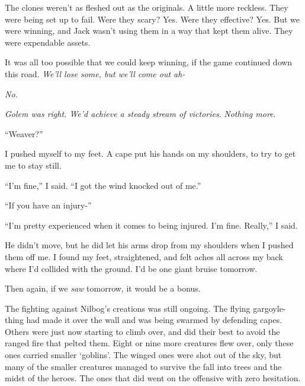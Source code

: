 The clones weren't as fleshed out as the originals.  A little more reckless.  They were being set up to fail.  Were they scary?  Yes.  Were they effective?  Yes.  But we were winning, and Jack wasn't using them in a way that kept them alive.  They were expendable assets.



It was all too possible that we could keep winning, if the game continued down this road.  \emph{We'll lose some, but we'll come out ah-}



\emph{No.}



\emph{Golem was right.  We'd achieve a steady stream of victories}.  \emph{Nothing more}.



``Weaver?''



I pushed myself to my feet.  A cape put his hands on my shoulders, to try to get me to stay still.



``I'm fine,'' I said.  ``I got the wind knocked out of me.''



``If you have an injury-''



``I'm pretty experienced when it comes to being injured.  I'm fine.  Really,'' I said.



He didn't move, but he did let his arms drop from my shoulders when I pushed them off me.  I found my feet, straightened, and felt aches all across my back where I'd collided with the ground.  I'd be one giant bruise tomorrow.



Then again, if we \emph{saw} tomorrow, it would be a bonus.



The fighting against Nilbog's creations was still ongoing.  The flying gargoyle-thing had made it over the wall and was being swarmed by defending capes.  Others were just now starting to climb over, and did their best to avoid the ranged fire that pelted them.  Eight or nine more creatures flew over, only these ones carried smaller `goblins'.  The winged ones were shot out of the sky, but many of the smaller creatures managed to survive the fall into trees and the midst of the heroes.   The ones that did went on the offensive with zero hesitation.




